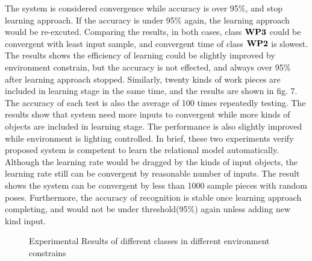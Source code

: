 \documentclass[journal]{IEEEtran}
\begin{document}
 The system is considered convergence while accuracy is over 95$\%$, and stop learning approach. If the accuracy is under 95$\%$ again, the learning approach would be re-excuted. Comparing the results, in both cases, class $\bf{WP3}$ could be convergent with least input sample, and convergent time of class $\bf{WP2}$ is slowest. The results shows the efficiency of learning could be slightly improved by environment constrain, but the accuracy is not effected, and always over 95$\%$ after learning approach stopped. Similarly, twenty kinds of work pieces are included in learning stage in the same time, and the results are shown in fig. 7. The accuracy of each test is also the average of 100 times repeatedly testing. The results show that system need more inputs to convergent while more kinds of objects are included in learning stage. The performance is also slightly improved while environment is lighting controlled. In brief, these two experiments verify proposed system is competent to learn the relational model automatically. Although the learning rate would be dragged by the kinds of input objects, the learning rate still can be convergent by reasonable number of inputs. The result shows the system can be convergent by less than 1000 sample pieces with random poses. Furthermore, the accuracy of recognition is stable once learning approach completing, and would not be under threshold(95$\%$) again unless adding new kind input.


 
\begin{figure}[!t]
\centering


\caption{Experimental Results of different classes in different environment constrains}

\end{figure}
\end{document}
